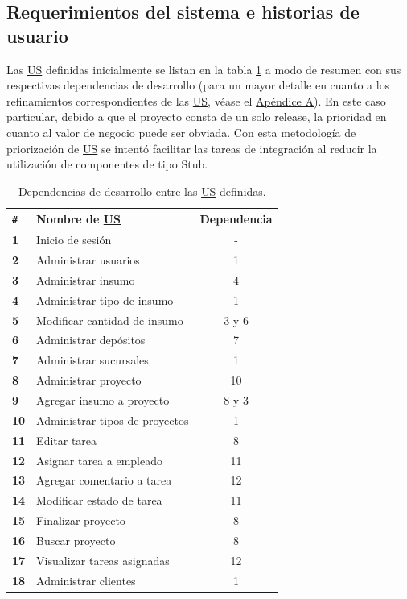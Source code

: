 \documentclass[a4paper, 12pt,twoside]{report}  %
\numberwithin{equation}{subsection} %
\begin{document}
\subsection{Requerimientos del sistema e historias de usuario}
\label{requerimientos_del_sistema_e_historias_de_usuario}
Las \hyperlink{US}{US} definidas inicialmente se listan en la tabla \ref{tabla_dependencias_iniciales_us} a modo de resumen con sus respectivas dependencias de desarrollo (para un mayor detalle en cuanto a los refinamientos correspondientes de las \hyperlink{US}{US}, véase el \hyperlink{apendice_a}{Apéndice A}). En este caso particular, debido a que el proyecto consta de un solo release, la prioridad en cuanto al valor de negocio puede ser obviada. Con esta metodología de priorización de \hyperlink{US}{US} se intentó facilitar las tareas de integración al reducir la utilización de componentes de tipo Stub.

\begin{table}[h!]
\centering
\begin{tabular}{ |p{0.5cm}|p{9cm}|c|  }
\hline
\verb|#|& \textbf{Nombre de \hyperlink{US}{US}}& \textbf{Dependencia} \\
\hline
\textbf{1} & Inicio de sesión & - \\
\hline
\textbf{2} & Administrar usuarios & 1 \\
\hline
\textbf{3} & Administrar insumo & 4 \\
\hline
\textbf{4} & Administrar tipo de insumo & 1 \\
\hline
\textbf{5} & Modificar cantidad de insumo & 3 y 6 \\
\hline
\textbf{6} & Administrar depósitos & 7 \\
\hline
\textbf{7} & Administrar sucursales & 1 \\
\hline
\textbf{8} & Administrar proyecto & 10 \\
\hline
\textbf{9} & Agregar insumo a proyecto & 8 y 3 \\
\hline
\textbf{10} & Administrar tipos de proyectos & 1 \\
\hline
\textbf{11} & Editar tarea & 8 \\
\hline
\textbf{12} & Asignar tarea a empleado & 11\\
\hline
\textbf{13} & Agregar comentario a tarea & 12 \\
\hline
\textbf{14} & Modificar estado de tarea & 11 \\
\hline
\textbf{15} & Finalizar proyecto & 8 \\
\hline
\textbf{16} & Buscar proyecto & 8 \\
\hline
\textbf{17} & Visualizar tareas asignadas & 12 \\
\hline
\textbf{18} & Administrar clientes & 1 \\
\hline
\end{tabular}
\caption{Dependencias de desarrollo entre las \protect\hyperlink{US}{US} definidas.}
\label{tabla_dependencias_iniciales_us}
\end{table}
\end{document}
